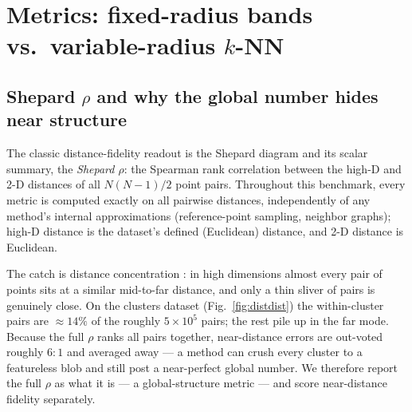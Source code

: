 \documentclass[11pt]{article}
\begin{document}
\section{Metrics: fixed-radius bands vs.\ variable-radius $k$-NN}
\label{sec:metrics}

\subsection{Shepard $\rho$ and why the global number hides near structure}
\label{sec:bands}

The classic distance-fidelity readout is the Shepard diagram
\cite{shepard1962} and its scalar summary, the \emph{Shepard $\rho$}: the
Spearman rank correlation between the high-D and 2-D distances of all
$N(N{-}1)/2$ point pairs. Throughout this benchmark, every metric is computed
exactly on all pairwise distances, independently of any method's internal
approximations (reference-point sampling, neighbor graphs); high-D distance
is the dataset's defined (Euclidean) distance, and 2-D distance is Euclidean.

The catch is distance concentration \cite{beyer1999nearest,
aggarwal2001surprising}: in high dimensions almost every pair of points sits
at a similar mid-to-far distance, and only a thin sliver of pairs is
genuinely close. On the clusters dataset (Fig.~\ref{fig:distdist}) the
within-cluster pairs are ${\approx}14\%$ of the roughly $5{\times}10^5$
pairs; the rest pile up in the far mode. Because the full $\rho$ ranks all
pairs together, near-distance errors are out-voted roughly $6{:}1$ and
averaged away --- a method can crush every cluster to a featureless blob and
still post a near-perfect global number. We therefore report the full $\rho$
as what it is --- a global-structure metric --- and score near-distance
fidelity separately.
\end{document}
